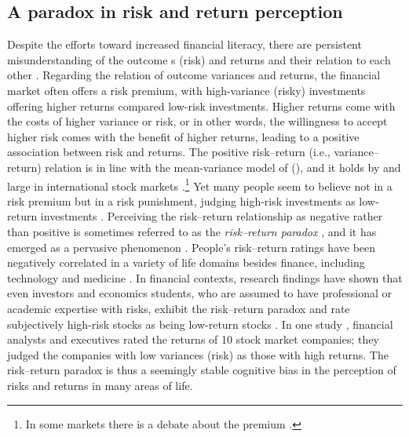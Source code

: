 \documentclass[a4paper,man, natbib,floatsintext]{apa6} %
\begin{document}
\subsection{A paradox in risk and return perception} Despite the efforts toward increased financial literacy, there are persistent misunderstanding of the outcome s (risk) and returns and their relation to each other \citep{Shefrin1995,Ganzach2000,Kempf2014}. Regarding the relation of outcome variances and returns, the financial market often offers a risk premium, with high-variance (risky) investments offering higher returns compared low-risk investments. Higher returns come with the costs of higher variance or risk, or in other words, the willingness to accept higher risk comes with the benefit of  higher returns, leading to a positive association between risk and returns. The positive risk--return (i.e., variance--return) relation is in line with the mean-variance model of \citeauthor[][]{Markowitz1952} (\citeyear[][]{Markowitz1952}), and it holds by and large in international stock markets \citep[][]{Dimson2003}.\footnote{In some markets there is a debate about the premium \citep[see, e.g.,][]{Figenbaum1986}.} Yet many people seem to believe not in a risk premium but in a risk punishment, judging high-risk investments as low-return investments \citep[][]{Shefrin1995, Shefrin2000, Shefrin2001, Kempf2014, Ganzach2000}. Perceiving the risk--return relationship as negative rather than positive is sometimes referred to as the  \textit{risk--return paradox} \citep[][]{Figenbaum1986}, and it has emerged as a pervasive phenomenon \citep{Kempf2014,Ganzach2000}. People's risk--return ratings have been negatively correlated in a variety of life domains besides finance, including technology and medicine \citep[e.g.,][]{Fischhoff1978, Alhakami1994,Sokolowska2015,Fleming2012}. In financial contexts, research findings have shown that even investors and economics students, who are assumed to have professional or academic expertise with risks, exhibit the risk--return paradox and rate subjectively high-risk stocks as being low-return stocks \citep{Kempf2014}. In one study \citep{Shefrin1995}, financial analysts and executives rated the returns of 10 stock market companies; they judged the companies with low variances (risk) as those with high returns. %
The risk--return paradox is thus a seemingly stable cognitive bias in the perception of risks and returns in many areas of life.
\end{document}
